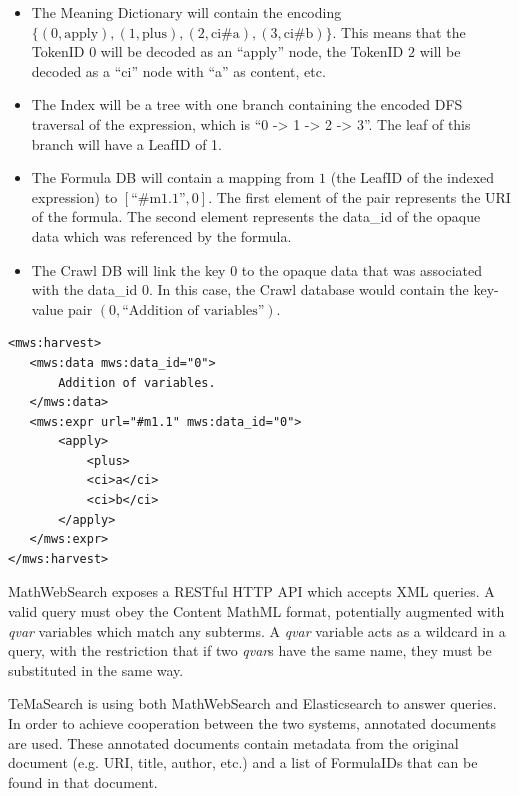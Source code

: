 \documentclass[a4paper,oneside]{article}
\def\mws{\textsf{MathWebSearch}\xspace}
\def\tms{\textsf{TeMaSearch}\xspace}
\def\els{\textsf{Elasticsearch}\xspace}
\def\cmml{\textsf{Content MathML}\xspace}
\def\xml{\textsf{XML}\xspace}
\begin{document}
\begin{itemize}
    \item The Meaning Dictionary will contain the encoding\\
        $\{(0, \text{apply}), (1, \text{plus}), (2, \text{ci\#a}), (3,
        \text{ci\#b})\}$. This means that the \textsf{TokenID} $0$ will be
        decoded as an ``apply'' node, the \textsf{TokenID} $2$ will be decoded
        as a ``ci'' node with ``a'' as content, etc.
    \item The Index will be a tree with one branch containing the encoded DFS
        traversal of the expression, which is ``0 -> 1 -> 2 -> 3''. The leaf of
        this branch will have a \textsf{LeafID} of 1.
    \item The Formula DB will contain a mapping from $1$ (the \textsf{LeafID}
        of the indexed expression) to $[\text{``\#m1.1''}, 0]$. The first
        element of the pair represents the URI of the formula. The second
        element represents the \textsf{data\_id} of the opaque data which was
        referenced by the formula.
    \item The Crawl DB will link the key $0$ to the opaque data that was
        associated with the \textsf{data\_id} $0$. In this case, the Crawl
        database would contain the key-value pair $(0, \text{``Addition of
        variables''})$.
\end{itemize}

\begin{lstlisting}[float,
                   language={[m]MathML},
                   label=lst:harvest_ex,
                   frame=lines,
                   caption={Harvest Example}]
<mws:harvest>
   <mws:data mws:data_id="0">
       Addition of variables.
   </mws:data>
   <mws:expr url="#m1.1" mws:data_id="0">
       <apply>
           <plus>
           <ci>a</ci>
           <ci>b</ci>
       </apply>
   </mws:expr>
</mws:harvest>
\end{lstlisting}
\FloatBarrier

\mws exposes a RESTful HTTP API which accepts \xml queries.
A valid query must obey the \cmml format, potentially augmented with
\emph{qvar} variables which match any subterms.  A \emph{qvar} variable acts as
a wildcard in a query, with the restriction that if two \emph{qvar}s have the
same name, they must be substituted in the same way.

\tms is using both \mws and \els to answer queries.
In order to achieve cooperation between the two systems, annotated documents
are used. These annotated documents contain metadata from the original document
(e.g. URI, title, author, etc.) and a list of \textsf{FormulaID}s that can be
found in that document.
\end{document}
